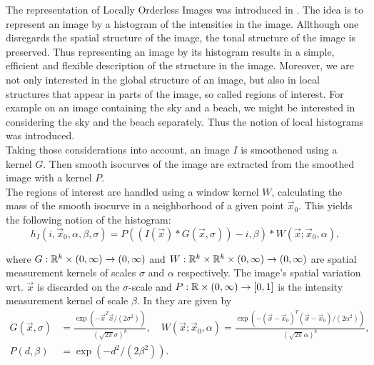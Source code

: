 The representation of Locally Orderless Images was introduced in \cite{koe.99}. The idea is to represent an image by a histogram of the intensities in the image. Allthough one disregards the spatial structure of the image, the tonal structure of the image is preserved. Thus representing an image by its histogram results in a simple, efficient and flexible description of the structure in the image. Moreover, we are not only interested in the global structure of an image, but also in local structures that appear in parts of the image, so called regions of interest. For example on an image containing the sky and a beach, we might be interested in considering the sky and the beach separately. Thus the notion of local histograms was introduced.\\

Taking those considerations into account, an image $I$ is smoothened using a kernel $G$. Then smooth isocurves of the image are extracted from the smoothed image with a kernel $P$.\\
The regions of interest are handled using a window kernel $W$, calculating the mass of the smooth isocurve in a neighborhood of a given point $\vec{x}_0$. This yields the following notion of the histogram:
\begin{equation}
  h_I(i,\vec{x}_0,\alpha,\beta,\sigma) = P((I(\vec{x})*G(\vec{x},\sigma))-i,\beta)*W(\vec{x};\vec{x}_0,\alpha),
\end{equation}

where $G:\mathbb R^k\times (0,\infty)\to (0,\infty)$ and $W:\mathbb R^k\times \mathbb R^k\times (0,\infty)\to (0,\infty)$ are spatial measurement kernels of scales $\sigma$ and $\alpha$ respectively. The image's spatial variation wrt. $\vec{x}$ is discarded on the $\sigma$-scale and $P:\mathbb R\times(0,\infty)\to [0,1]$ is the intensity measurement kernel of scale $\beta$. In \cite{koe.99} they are given by
\begin{equation}
  \begin{split}
    G(\vec{x},\sigma) &= \frac{\exp(-\vec{x}^T\vec{x}/(2\sigma^2))}{(\sqrt{2\pi}\sigma)^{k}},\quad W(\vec{x};\vec{x}_0,\alpha) = \frac{\exp(-(\vec{x}-\vec{x}_0)^T(\vec{x}-\vec{x}_0)/(2\alpha^2))}{(\sqrt{2\pi}\alpha)^{k}},\\
    P(d,\beta) &= \exp(-d^2/(2\beta^2)).
  \end{split}\label{loikernel}
\end{equation}

